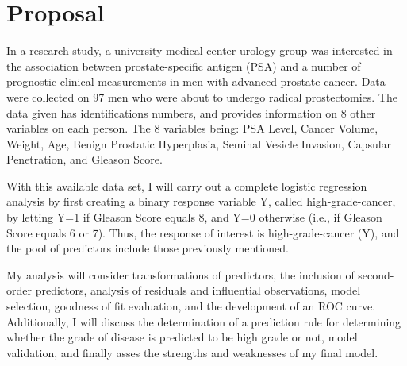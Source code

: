 %
%

\section{Proposal}
In a research study, a university medical center urology group was interested in the association between prostate-specific antigen (PSA) and a number of prognostic clinical measurements in men with advanced prostate cancer. Data were collected on 97 men who were about to undergo radical prostectomies. The data given has identifications numbers, and provides information on 8 other variables on each person. The 8 variables being: PSA Level, Cancer Volume, Weight, Age, Benign Prostatic Hyperplasia, Seminal Vesicle Invasion, Capsular Penetration, and Gleason Score. \par
With this available data set, I will carry out a complete logistic regression analysis by first creating a binary response variable Y, called high-grade-cancer, by letting Y=1 if Gleason Score equals 8, and Y=0 otherwise (i.e., if Gleason Score equals 6 or 7). Thus, the response of interest is high-grade-cancer (Y), and the pool of predictors include those previously mentioned. \par
My analysis will consider transformations of predictors, the inclusion of second-order predictors, analysis of residuals and influential observations, model selection, goodness of fit evaluation, and the development of an ROC curve. Additionally, I will discuss the determination of a prediction rule for determining whether the grade of disease is predicted to be high grade or not, model validation, and finally asses the strengths and weaknesses of my final model. \\
